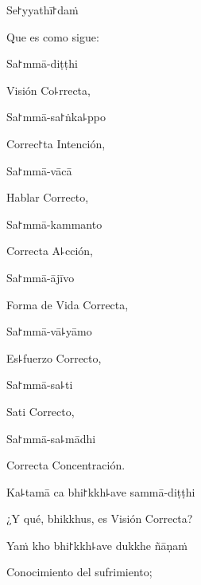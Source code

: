 Se꜓yyathī꜓daṁ

\begin{english}
	Que es como sigue:
\end{english}

Sa꜓mmā-diṭṭhi

\begin{english}
	Visión Co꜕rrecta,
\end{english}

Sa꜓mmā-sa꜓ṅka꜕ppo

\begin{english}
	Correc꜓ta Intención,
\end{english}

Sa꜓mmā-vācā

\begin{english}
	Hablar Correcto,
\end{english}

Sa꜓mmā-kammanto

\begin{english}
	Correcta A꜕cción,
\end{english}

Sa꜓mmā-ājīvo

\begin{english}
	Forma de Vida Correcta,
\end{english}

Sa꜓mmā-vā꜕yāmo

\begin{english}
	Es꜕fuerzo Correcto,
\end{english}

\ifaivedition
\clearpage
\fi

Sa꜓mmā-sa꜕ti

\begin{english}
	Sati Correcto,
\end{english}

Sa꜓mmā-sa꜕mādhi

\begin{english}
	Correcta Concentración.
\end{english}

Ka꜕tamā ca bhi꜓kkh꜕ave sammā-diṭṭhi

\begin{english}
	¿Y qué, bhikkhus, es Visión Correcta?
\end{english}

Yaṁ kho bhi꜓kkh꜕ave dukkhe ñāṇaṁ

\begin{english}
	Conocimiento del sufrimiento;
\end{english}

